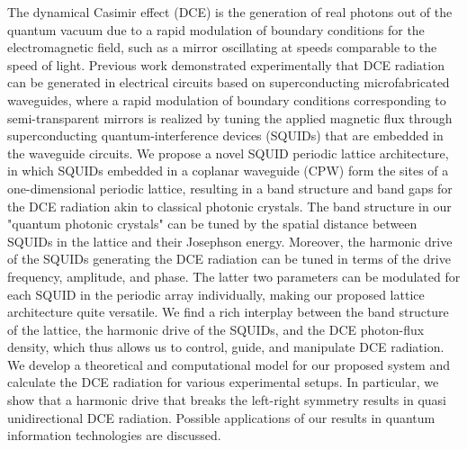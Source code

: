 

The dynamical Casimir effect (DCE) is the generation of real photons out of the quantum vacuum due to a rapid modulation of boundary conditions for the electromagnetic field, such as a mirror oscillating at speeds comparable to the speed of light. 
Previous work demonstrated experimentally that
DCE radiation can be generated 
in electrical circuits based on superconducting microfabricated waveguides, where a rapid modulation of boundary conditions corresponding to semi-transparent mirrors is realized by tuning the applied magnetic flux through superconducting quantum-interference devices (SQUIDs) that are embedded in the waveguide circuits. We propose a novel SQUID periodic lattice architecture, in which SQUIDs embedded in a coplanar waveguide (CPW) form the sites of a one-dimensional periodic lattice, resulting in a band structure and band gaps for the DCE radiation akin to classical photonic crystals. The band structure in our "quantum photonic crystals"
can be tuned by the spatial distance between SQUIDs in the lattice and their Josephson energy. 
Moreover, the harmonic drive of the SQUIDs generating the DCE radiation can be tuned in terms of the drive frequency, amplitude, and phase.  
The latter two parameters can be modulated for each SQUID in the periodic array individually, making our proposed lattice architecture quite versatile. We find a rich interplay between the band structure of the lattice, 
the harmonic drive of the SQUIDs, and the DCE photon-flux density, which thus allows us to control, guide, and manipulate DCE radiation. 
We develop a theoretical and computational model for our proposed system and calculate the DCE radiation 
for various experimental setups. In particular, we show that a harmonic drive that breaks the left-right symmetry
results in quasi unidirectional DCE radiation. Possible applications of our results in quantum information technologies
are discussed.








